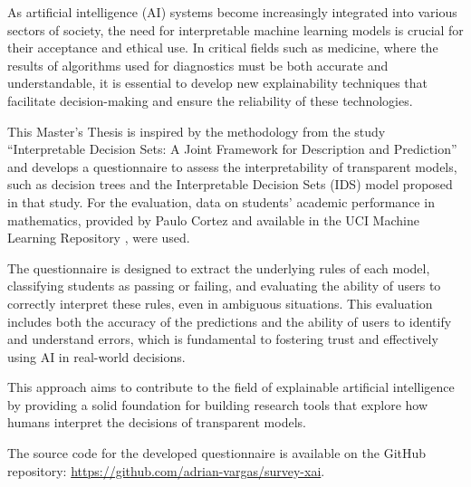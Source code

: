 As artificial intelligence (AI) systems become increasingly integrated into various sectors of society, the need for interpretable machine learning models is crucial for their acceptance and ethical use. In critical fields such as medicine, where the results of algorithms used for diagnostics must be both accurate and understandable, it is essential to develop new explainability techniques that facilitate decision-making and ensure the reliability of these technologies.

This Master's Thesis is inspired by the methodology from the study “Interpretable Decision Sets: A Joint Framework for Description and Prediction” \cite{lakkaraju-2016} and develops a questionnaire to assess the interpretability of transparent models, such as decision trees and the Interpretable Decision Sets (IDS) model proposed in that study. For the evaluation, data on students' academic performance in mathematics, provided by Paulo Cortez and available in the UCI Machine Learning Repository \cite{cortez-2014}, were used.

The questionnaire is designed to extract the underlying rules of each model, classifying students as passing or failing, and evaluating the ability of users to correctly interpret these rules, even in ambiguous situations. This evaluation includes both the accuracy of the predictions and the ability of users to identify and understand errors, which is fundamental to fostering trust and effectively using AI in real-world decisions.

This approach aims to contribute to the field of explainable artificial intelligence by providing a solid foundation for building research tools that explore how humans interpret the decisions of transparent models.

The source code for the developed questionnaire is available on the GitHub repository: \href{https://github.com/adrian-vargas/survey-xai}{https://github.com/adrian-vargas/survey-xai}.



